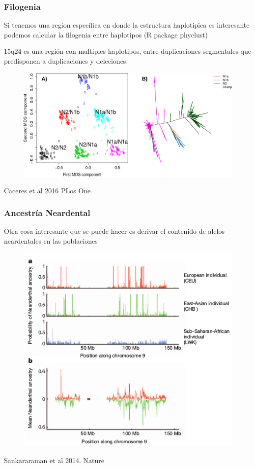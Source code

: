 \documentclass{beamer}\usepackage[]{graphicx}\usepackage[]{color}
\begin{document}
\begin{frame}[fragile]
\frametitle{Filogenia}

Si tenemos una region espec\'ifica en donde la estructura haplotipica es interesante podemos calcular la filogenia entre haplotipos (R package phyclust)

15q24 es una regi\'on con multiples haplotipos, entre duplicaciones segmentales que predisponen a duplicaciones y deleciones. 
\begin{figure}[htbp]
\begin{center}
\includegraphics[width=.7\linewidth]{man2c1.PNG}
\end{center}
\end{figure}


Caceres et al 2016 PLos One
\end{frame}



\begin{frame}[fragile]
\frametitle{Ancestr\'ia Neardental}
Otra cosa interesante que se puede hacer es derivar el contenido de alelos neardentales en las poblaciones

\begin{figure}[htbp]
\begin{center}
\includegraphics[width=.5\linewidth]{near1.png}
\end{center}
\end{figure}

Sankararaman et al 2014. Nature
\end{frame}
\end{document}
